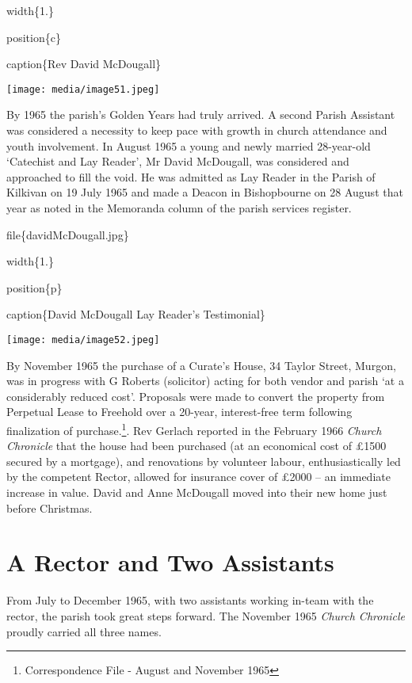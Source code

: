 width\{1.\}

position\{c\}

caption\{Rev David McDougall\}

\texttt{[image: media/image51.jpeg]}

By 1965 the parish's Golden Years had truly arrived. A second Parish Assistant was considered a necessity to keep pace with growth in church attendance and youth involvement. In August 1965 a young and newly married 28-year-old `Catechist and Lay Reader', Mr David McDougall, was considered and approached to fill the void. He was admitted as Lay Reader in the Parish of Kilkivan on 19 July 1965 and made a Deacon in Bishopbourne on 28 August that year as noted in the Memoranda column of the parish services register.

file\{davidMcDougall.jpg\}

width\{1.\}

position\{p\}

caption\{David McDougall Lay Reader's Testimonial\}

\texttt{[image: media/image52.jpeg]}

By November 1965 the purchase of a Curate's House, 34 Taylor Street, Murgon, was in progress with G Roberts (solicitor) acting for both vendor and parish `at a considerably reduced cost'. Proposals were made to convert the property from Perpetual Lease to Freehold over a 20-year, interest-free term following finalization of purchase.\footnote{Correspondence File - August and November 1965}. Rev Gerlach reported in the February 1966 \emph{Church Chronicle} that the house had been purchased (at an economical cost of £1500 secured by a mortgage), and renovations by volunteer labour, enthusiastically led by the competent Rector, allowed for insurance cover of £2000 -- an immediate increase in value. David and Anne McDougall moved into their new home just before Christmas.

\hypertarget{a-rector-and-two-assistants}{%
\section{A Rector and Two Assistants}\label{a-rector-and-two-assistants}}

From July to December 1965, with two assistants working in-team with the rector, the parish took great steps forward. The November 1965 \emph{Church Chronicle} proudly carried all three names.

